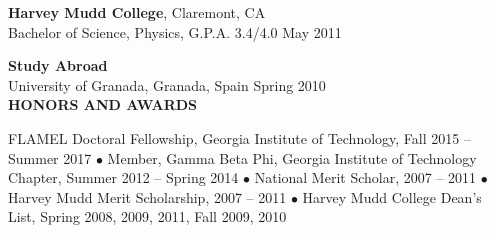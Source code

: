 \documentclass[10pt]{article}
\newenvironment{changemargin}[2]{%
  \list{}{\rightmargin#2\leftmargin#1
    \parsep=0pt\topsep=1pt\partopsep=0pt}
\item[]} {\endlist}
\newenvironment{indentmore}{\begin{changemargin}{10pt}{0cm}}{\end{changemargin}}
\begin{document}
\textbf{Harvey Mudd College}, Claremont, CA \\
\hspace*{10pt}Bachelor of Science, Physics, G.P.A. 3.4/4.0 \hfill May 2011

\vspace{5pt}
\textbf{Study Abroad} \\
\hspace*{10pt}University of Granada, Granada, Spain \hfill Spring 2010\\


\textbf{\large HONORS AND AWARDS}
\begin{indentmore}
FLAMEL Doctoral Fellowship, Georgia Institute of Technology, Fall 2015 -- Summer 2017 $\bullet$  Member, Gamma Beta Phi, Georgia Institute of Technology Chapter, Summer 2012 -- Spring 2014 $\bullet$ National Merit Scholar, 2007 -- 2011 $\bullet$ Harvey Mudd Merit Scholarship, 2007 -- 2011 $\bullet$ Harvey Mudd College Dean's List, Spring 2008, 2009, 2011, Fall 2009, 2010
\end{indentmore}
\end{document}
